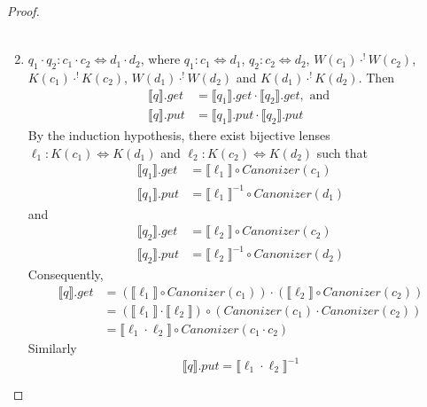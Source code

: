 \documentclass{svproc}
\newcommand{\canonizer}{\ensuremath{\mathit{Canonizer}}}
\begin{document}
\begin{proof}
\begin{enumerate}
\begin{align*}
    \end{align*}
  \item
    $q_1 \cdot q_2: c_1 \cdot c_2 \Leftrightarrow d_1 \cdot d_2$, where $q_1 : c_1
    \Leftrightarrow d_1 $,  $q_2 : c_2 \Leftrightarrow d_2$, $W(c_1)
    \cdot^! W(c_2)$, $K(c_1) \cdot^! K(c_2)$, $W(d_1) \cdot^! W(d_2)$ and $
    K(d_1) \cdot^! K(d_2)$. Then
    \begin{align*}
      \llbracket q \rrbracket.get &= \llbracket q_1 \rrbracket.get \cdot \llbracket
                                    q_2 \rrbracket.get, \text{ and }\\
      \llbracket q \rrbracket.put &= \llbracket q_1 \rrbracket.put \cdot \llbracket
                                    q_2 \rrbracket.put
    \end{align*}
    By the induction hypothesis, there exist bijective lenses $\ell_1 : K(c_1)
    \Leftrightarrow K(d_1)$ and $\ell_2 : K(c_2) \Leftrightarrow K(d_2)$ such that
    \begin{align*}
      \llbracket q_1 \rrbracket.get &= \llbracket \ell_1 \rrbracket \circ
                                      \canonizer(c_1)\\
      \llbracket q_1 \rrbracket.put &= {\llbracket \ell_1 \rrbracket}^{-1} \circ
                                      \canonizer(d_1)
    \end{align*}
    and
    \begin{align*}
      \llbracket q_2 \rrbracket.get &= \llbracket \ell_2 \rrbracket \circ
                                      \canonizer(c_2)\\
      \llbracket q_2 \rrbracket.put &= {\llbracket \ell_2 \rrbracket}^{-1} \circ
                                      \canonizer(d_2)
    \end{align*}
    Consequently,
    \begin{align*}
      \llbracket q \rrbracket.get &= (\llbracket \ell_1 \rrbracket \circ
                                    \canonizer(c_1)) \cdot  (\llbracket \ell_2 \rrbracket \circ
                                    \canonizer(c_2))\\
                                  &= (\llbracket \ell_1 \rrbracket \cdot \llbracket \ell_2
                                    \rrbracket) \circ (\canonizer(c_1) \cdot \canonizer(c_2))\\
                                  &= \llbracket \ell_1 \cdot  \ell_2 \rrbracket \circ \canonizer(c_1 \cdot c_2)
    \end{align*}
    Similarly
    $$
    \llbracket q \rrbracket.put = \llbracket \ell_1 \cdot  \ell_2 \rrbracket^{-1}
$$
\end{enumerate}
\end{proof}
\end{document}
